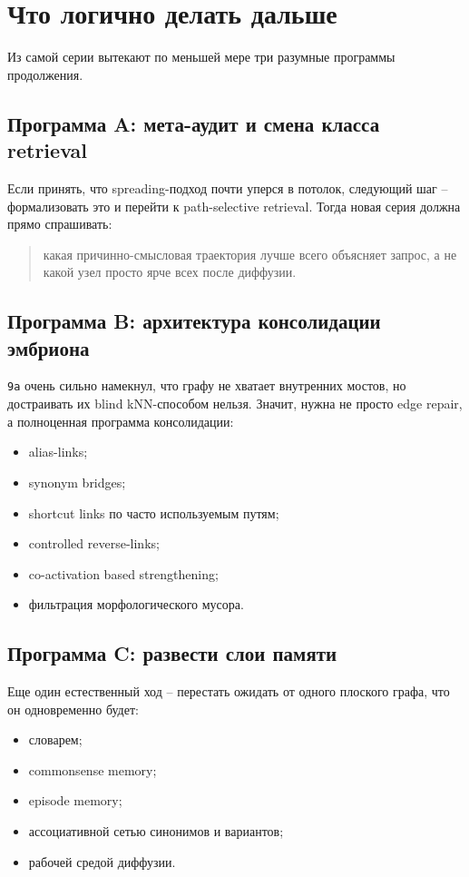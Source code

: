 \section{Что логично делать дальше}

Из самой серии вытекают по меньшей мере три разумные программы продолжения.

\subsection{Программа A: мета-аудит и смена класса retrieval}

Если принять, что spreading-подход почти уперся в потолок, следующий шаг --
формализовать это и перейти к path-selective retrieval. Тогда новая серия должна
прямо спрашивать:

\begin{quote}
какая причинно-смысловая траектория лучше всего объясняет запрос, а не какой
узел просто ярче всех после диффузии.
\end{quote}

\subsection{Программа B: архитектура консолидации эмбриона}

\texttt{9a} очень сильно намекнул, что графу не хватает внутренних мостов, но
достраивать их blind kNN-способом нельзя. Значит, нужна не просто edge repair, а
полноценная программа консолидации:

\begin{itemize}[leftmargin=2em]
\item alias-links;
\item synonym bridges;
\item shortcut links по часто используемым путям;
\item controlled reverse-links;
\item co-activation based strengthening;
\item фильтрация морфологического мусора.
\end{itemize}

\subsection{Программа C: развести слои памяти}

Еще один естественный ход -- перестать ожидать от одного плоского графа, что он
одновременно будет:

\begin{itemize}[leftmargin=2em]
\item словарем;
\item commonsense memory;
\item episode memory;
\item ассоциативной сетью синонимов и вариантов;
\item рабочей средой диффузии.
\end{itemize}

